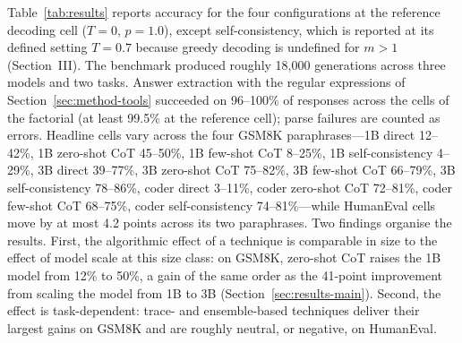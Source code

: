 \documentclass[conference]{IEEEtran}
\begin{document}
Table~\ref{tab:results} reports accuracy for the four configurations
at the reference decoding cell ($T = 0$, $p = 1.0$), except
self-consistency, which is reported at its defined setting $T = 0.7$
because greedy decoding is undefined for $m > 1$ (Section~III).  The
benchmark produced roughly 18,000 generations across three models and
two tasks.  Answer extraction with the regular expressions of
Section~\ref{sec:method-tools} succeeded on 96--100\% of responses
across the cells of the factorial (at least 99.5\% at the reference
cell); parse failures are counted as errors.  Headline cells vary
across the four GSM8K paraphrases---1B direct 12--42\%, 1B zero-shot
CoT 45--50\%, 1B few-shot CoT 8--25\%, 1B self-consistency 4--29\%, 3B
direct 39--77\%, 3B zero-shot CoT 75--82\%, 3B few-shot CoT 66--79\%,
3B self-consistency 78--86\%, coder direct 3--11\%, coder zero-shot
CoT 72--81\%, coder few-shot CoT 68--75\%, coder self-consistency
74--81\%---while HumanEval cells move by at most 4.2 points across
its two paraphrases.  Two findings organise the results.  First, the
algorithmic effect of a technique is comparable in size to the effect
of model scale at this size class: on GSM8K, zero-shot CoT raises
the 1B model from 12\% to 50\%, a gain of the same order as the
41-point improvement from scaling the model from 1B to 3B
(Section~\ref{sec:results-main}).  Second, the effect is
task-dependent: trace- and ensemble-based techniques deliver their
largest gains on GSM8K and are roughly neutral, or negative, on
HumanEval.
\end{document}
